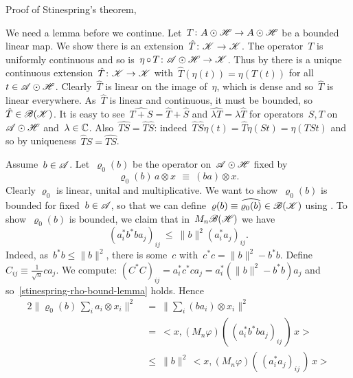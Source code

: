 \documentclass[b]{subfiles}
\begin{document}
\begin{parsec}
\begin{point}
\begin{point}{%
    Proof of Stinespring's theorem, }
\begin{point}
We need a lemma before we continue.
Let~$T\colon A \odot \mathscr{H} \to A \odot \mathscr{H}$
be a bounded linear map.
We show there is an extension~$\hat{T} \colon \mathscr{K} \to \mathscr{K}$.
The operator~$T$ is
uniformly continuous and so is~$\eta\mathop{\circ} T \colon \mathscr{A}\odot\mathscr{H} \to\mathscr{K}$.
Thus by 
there is a unique continuous extension~$\hat{T} \colon \mathscr{K} \to \mathscr{K}$
with~$\hat{T}(\eta(t)) = \eta(T(t))$
    for all~$t \in \mathscr{A}\odot\mathscr{H}$.
Clearly~$\hat{T}$ is linear on the image of~$\eta$,
    which is dense and so~$\hat{T}$ is linear everywhere.
As~$\hat{T}$ is linear and continuous, it must be
    bounded, so~$\hat{T} \in \mathscr{B}(\mathscr{K})$.
It is easy to see~$\widehat{T+S}=\hat{T}+\hat{S}$ and
    $\widehat{\lambda T} = \lambda \hat{T}$
    for operators~$S,T$ on~$\mathscr{A} \odot \mathscr{H}$ and~$\lambda \in \mathbb{C}$.
Also~$\widehat{TS} = \hat{T}\hat{S}$:
indeed~$\hat{T}\hat{S} \eta(t)
            = \hat{T} \eta(St)
            = \eta(TSt)$
    and so by uniqueness~$\hat{T}\hat{S} = \widehat{TS}$.
\end{point}
\begin{point}%
    Assume~$b\in \mathscr{A}$.
    Let~$\varrho_0(b)$ be the operator on~$\mathscr{A} \odot \mathscr{H}$
    fixed by
\begin{equation*}
    \varrho_0(b)\, a\otimes x\, \  \equiv\  (b a) \otimes x.
\end{equation*}
Clearly $\varrho_0$ is linear, unital and multiplicative.
We want to show~$\varrho_0(b)$ is bounded for fixed~$b \in \mathscr{A}$,
    so that we can define~$\varrho(b) \equiv \widehat{\varrho_0(b)}
            \in \mathscr{B}(\mathscr{K})$ using .
    To show~$\varrho_0(b)$ is bounded, we claim that in~$M_n\mathscr{B}(\mathscr{H})$
we have
\begin{equation}\label{stinespring-rho-bound-lemma}
(a_i^*b^*ba_j)_{ij} \ \leq\  \|b\|^2 (a_i^*a_j)_{ij}.
\end{equation}
Indeed, as~$b^*b \leq \|b\|^2$,
    there is some~$c$ with~$c^*c = \|b\|^2 - b^*b$.
Define~$C_{ij} \equiv \frac{1}{\sqrt{n}} ca_j$.
We compute:
$ (C^*C)_{ij} = a_i^*c^*ca_j = a_i^* (\|b\|^2 - b^*b) a_j$
and so~\eqref{stinespring-rho-bound-lemma} holds.
Hence
\begin{alignat*}{2}
    \bigl\| \varrho_0(b) \,\sum_i a_i \otimes x_i \bigr\|^2
    & \ = \ \bigl\| \sum_i (ba_i) \otimes x_i \bigr\|^2 \\
    & \ =\  \bigl< x, (M_n\varphi)(\, (a_i^* b^*b a_j)_{ij}\,)\,x\bigr> \\
    &\ \leq\  \|b\|^2 \, \bigl< x, (M_n\varphi)(\, (a_i^* a_j)_{ij}\,) \, x\bigr>

\end{alignat*}
\end{point}
\end{point}
\end{point}
\end{parsec}
\end{document}
